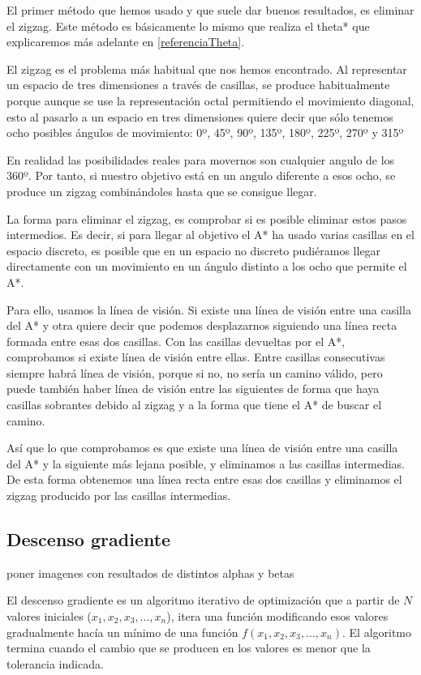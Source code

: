 El primer método que hemos usado y que suele dar buenos resultados, es eliminar el zigzag. Este método es básicamente lo mismo que realiza el theta* que explicaremos más adelante en \ref{referenciaTheta}.

El zigzag es el problema más habitual que nos hemos encontrado. Al representar un espacio de tres dimensiones a través de casillas, se produce habitualmente porque aunque se use la representación octal permitiendo el movimiento diagonal, esto al pasarlo a un espacio en tres dimensiones quiere decir que sólo tenemos ocho posibles ángulos de movimiento: 0º, 45º, 90º, 135º, 180º, 225º, 270º y 315º

En realidad las posibilidades reales para movernos son cualquier angulo de los 360º. Por tanto, si nuestro objetivo está en un angulo diferente a esos ocho, se produce un zigzag combinándoles hasta que se consigue llegar.

La forma para eliminar el zigzag, es comprobar si es posible eliminar estos pasos intermedios. Es decir, si para llegar al objetivo el A* ha usado varias casillas en el espacio discreto, es posible que en un espacio no discreto pudiéramos llegar directamente con un movimiento en un ángulo distinto a los ocho que permite el A*.

Para ello, usamos la línea de visión. Si existe una línea de visión entre una casilla del A* y otra quiere decir que podemos desplazarnos siguiendo una línea recta formada entre esas dos casillas. Con las casillas devueltas por el A*, comprobamos si existe línea de visión entre ellas. Entre casillas consecutivas siempre habrá línea de visión, porque si no, no sería un camino válido, pero puede también haber línea de visión entre las siguientes de forma que haya casillas sobrantes debido al zigzag y a la forma que tiene el A* de buscar el camino.

Así que lo que comprobamos es que existe una línea de visión entre una casilla del A* y la siguiente más lejana posible, y eliminamos a las casillas intermedias. De esta forma obtenemos una línea recta entre esas dos casillas y eliminamos el zigzag producido por las casillas intermedias.

\subsection{Descenso gradiente}
poner imagenes con resultados de distintos alphas y betas

El descenso gradiente es un algoritmo iterativo de optimización que a partir de $N$ valores iniciales ($x_1, x_2, x_3, ..., x_n$), itera una función modificando esos valores gradualmente hacía un mínimo de una función $f(x_1, x_2, x_3, ..., x_n)$. El algoritmo termina cuando el cambio que se producen en los valores es menor que la tolerancia indicada.

